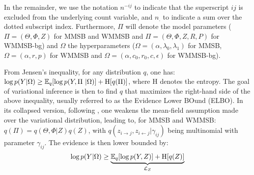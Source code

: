 In the remainder, we use the notation $n^{-ij}$ to indicate that the superscript $ij$ is excluded from the underlying count variable, and $n_{\bm{.}}$ to indicate a sum over the dotted subscript index. Furthermore, $\Pi$ will denote the model parameters ($\Pi = (\Theta,\Phi,Z)$ for MMSB and WMMSB and $\Pi = (\Theta,\Phi,Z,R,P)$ for WMMSB-bg) and $\Omega$ the hyperparameters ($\Omega = (\alpha,\lambda_0,\lambda_1)$ for MMSB, $\Omega = (\alpha,r,p)$ for WMMSB and $\Omega = (\alpha, c_0, r_0, c, \epsilon)$ for WMMSB-bg).

From Jensen's inequality, for any distribution $q$, one has: $\log p(Y | \Omega) \ge \mathbb{E}_{q}[\log p(Y, \Pi\ | \Omega)] + \textrm{H}[q(\Pi)]$,
where $\textrm{H}$ denotes the entropy. The goal of variational inference is then to find $q$ that maximizes the right-hand side of the above inequality, usually referred to as the Evidence Lower BOund (ELBO). In its collapsed version, following \cite{teh2007collapsed}, one weakens the mean-field assumption made over the variational distribution, leading to, for MMSB and WMMSB: $q(\Pi) = q(\Theta, \Phi | Z) q(Z)$,
with $q(z_{i \rightarrow j}, z_{i \leftarrow j}|\gamma_{ij})$ being multinomial with parameter $\gamma_{ij}$. The evidence is then lower bounded by:
%
\begin{equation*}
\log p(Y|\Omega) \geq \underbrace{\mathbb{E}_{q}[\log p(Y, Z)] + \textrm{H}[q(Z)]}_{\mathcal{L}_Z}
\end{equation*}

